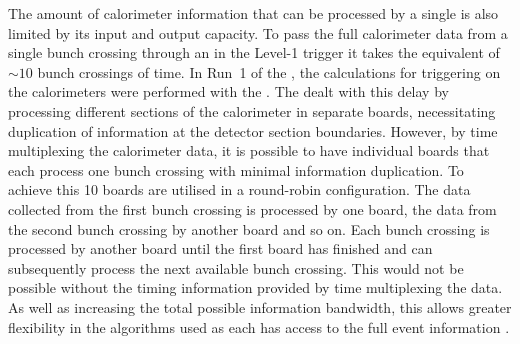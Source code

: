 The amount of calorimeter information that can be processed by a
single \FPGA is also limited by its input and output capacity. To pass
the full calorimeter data from a single bunch crossing through an
\FPGA in the Level-1 trigger it takes the equivalent of $\sim10$ bunch
crossings of time. In Run~1 of the \LHC, the calculations for
triggering on the calorimeters were performed with the \GCT
\cite{Khachatryan:2016bia}. The \GCT dealt with this delay by
processing different sections of the calorimeter in separate boards,
necessitating duplication of information at the detector section
boundaries. However, by time multiplexing the calorimeter data, it is
possible to have individual \FPGA boards that each process one bunch
crossing with minimal information duplication. To achieve this 10
\FPGA boards are utilised in a round-robin configuration. The data
collected from the first bunch crossing is processed by one board, the
data from the second bunch crossing by another board and so on. Each
bunch crossing is processed by another board until the first board has
finished and can subsequently process the next available bunch
crossing. This would not be possible without the timing information
provided by time multiplexing the data. As well as increasing the
total possible information bandwidth, this allows greater flexibility
in the algorithms used as each \FPGA has access to the full event
information \cite{1748-0221-9-10-C10034,1748-0221-7-01-C01060}. 

